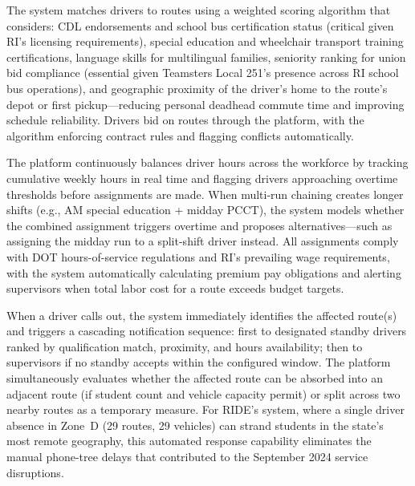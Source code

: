 \begin{description}[style=nextline, leftmargin=0.5cm]
    \item[\faIcon{calendar-alt} \textbf{Automated Bid/Assignment System:}] The system matches drivers to routes using a weighted scoring algorithm that considers: CDL endorsements and school bus certification status (critical given RI's licensing requirements), special education and wheelchair transport training certifications, language skills for multilingual families, seniority ranking for union bid compliance (essential given Teamsters Local 251's presence across RI school bus operations), and geographic proximity of the driver's home to the route's depot or first pickup---reducing personal deadhead commute time and improving schedule reliability. Drivers bid on routes through the platform, with the algorithm enforcing contract rules and flagging conflicts automatically.

    \item[\faIcon{user-clock} \textbf{Hours Optimization:}] The platform continuously balances driver hours across the workforce by tracking cumulative weekly hours in real time and flagging drivers approaching overtime thresholds before assignments are made. When multi-run chaining creates longer shifts (e.g., AM special education + midday PCCT), the system models whether the combined assignment triggers overtime and proposes alternatives---such as assigning the midday run to a split-shift driver instead. All assignments comply with DOT hours-of-service regulations and RI's prevailing wage requirements, with the system automatically calculating premium pay obligations and alerting supervisors when total labor cost for a route exceeds budget targets.

    \item[\faIcon{bell} \textbf{Real-Time Absence Management:}] When a driver calls out, the system immediately identifies the affected route(s) and triggers a cascading notification sequence: first to designated standby drivers ranked by qualification match, proximity, and hours availability; then to supervisors if no standby accepts within the configured window. The platform simultaneously evaluates whether the affected route can be absorbed into an adjacent route (if student count and vehicle capacity permit) or split across two nearby routes as a temporary measure. For RIDE's system, where a single driver absence in Zone~D (29 routes, 29 vehicles) can strand students in the state's most remote geography, this automated response capability eliminates the manual phone-tree delays that contributed to the September 2024 service disruptions.


\end{description}

